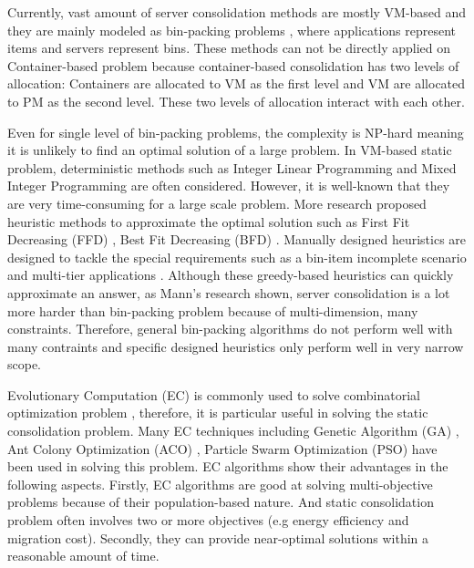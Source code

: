 \vspace{10mm}

Currently, vast amount of server consolidation methods are mostly VM-based and they are mainly modeled as bin-packing problems \cite{Mann:2015ua}, where applications represent items and servers represent bins. These methods can not be directly applied on Container-based problem because container-based consolidation has two levels of allocation: Containers are allocated to VM as the first level and VM are allocated to PM as the second level. These two levels of allocation interact with each other. 

Even for single level of bin-packing problems, the complexity is NP-hard meaning it is unlikely to find an optimal solution of a large problem.
In VM-based static problem, deterministic methods such as  
Integer Linear Programming \cite{Speitkamp:2010ck} and Mixed
Integer Programming \cite{Wang:2016eh} are often considered. However, it is well-known that they are very time-consuming for a large scale problem. More research proposed heuristic methods
 to approximate the optimal solution such as 
First Fit Decreasing (FFD) \cite{Panigrahy:2011wk}, Best Fit Decreasing (BFD) \cite{Beloglazov:2012ji}.
Manually designed heuristics are designed to tackle the special requirements such 
as a bin-item incomplete scenario \cite{Gupta:2008ul} and multi-tier applications \cite{Jung:2008vb, Li:2009wf}. Although these greedy-based heuristics can quickly approximate an answer,  as Mann's research \cite{Mann:2015ua} shown, server consolidation is a lot more harder than bin-packing problem because of multi-dimension, many constraints. Therefore, general bin-packing algorithms do not perform well with many contraints and specific designed heuristics only perform well in very narrow scope.

Evolutionary Computation (EC) is commonly used to solve combinatorial optimization problem \cite{Guzek:2015ds}, therefore, it is particular useful in solving the static consolidation problem.  Many EC techniques including Genetic Algorithm (GA) \cite{Xu:2010vh}, Ant Colony Optimization (ACO) \cite{Gao:2013gg, Mateos:2013bm}, Particle Swarm Optimization (PSO) \cite{Jeyarani:2012fg} have been used in solving this problem. EC algorithms show their advantages in the following aspects. Firstly, EC algorithms are good at solving multi-objective problems because of their population-based nature. And static consolidation problem often involves two or more objectives (e.g energy efficiency and migration cost). Secondly,  they can provide near-optimal solutions within a reasonable amount of time.  

